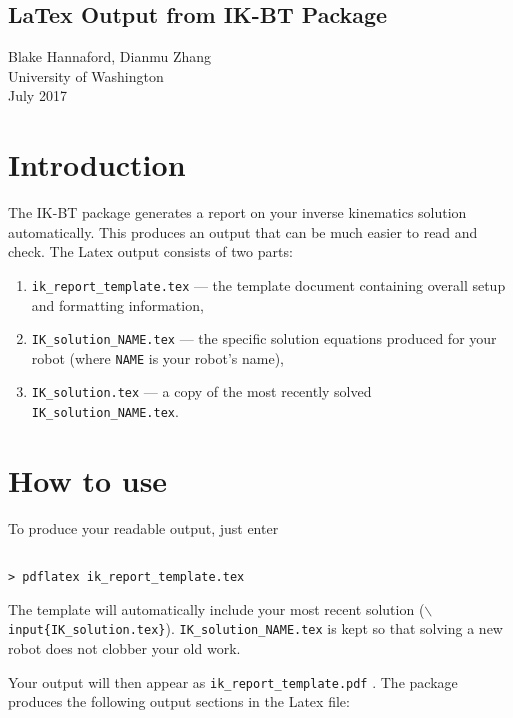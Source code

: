 \documentclass[letterpaper]{article}
\begin{document}
\begin{center}
\section*{LaTex Output from IK-BT Package}
Blake Hannaford, Dianmu Zhang\\
University of Washington\\
July 2017
\end{center}

\section{Introduction}
The IK-BT package generates a report on your inverse kinematics solution automatically.   This produces an output that can be much easier to read and check.   The Latex output consists of two parts:
\begin{enumerate}
    \item {\tt ik\_report\_template.tex} --- the template document containing overall setup and formatting information,
    \item {\tt IK\_solution\_NAME.tex}  --- the specific solution equations produced for your robot (where {\tt NAME} is your robot's name), 
    \item {\tt IK\_solution.tex} --- a copy of the most recently solved {\tt IK\_solution\_NAME.tex}.
\end{enumerate}

\section{How to use}
To produce your readable output, just enter
\begin{verbatim}

> pdflatex ik_report_template.tex

\end{verbatim}
The template will automatically include your most recent solution ({\tt $\backslash$input\{IK\_solution.tex\}}).  {\tt IK\_solution\_NAME.tex} is kept so that solving a new robot does not clobber your old work. 

Your output will then appear as {\tt ik\_report\_template.pdf} .   
The package produces the following output sections in the Latex file:
\end{document}
